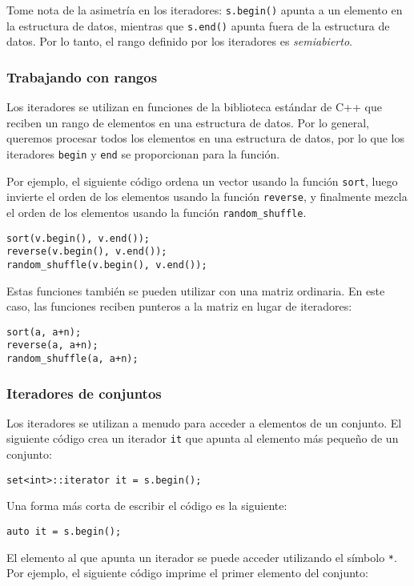 Tome nota de la asimetría en los iteradores:
\texttt{s.begin()} apunta a un elemento en la estructura de datos,
mientras que \texttt{s.end()} apunta fuera de la estructura de datos.
Por lo tanto, el rango definido por los iteradores es \emph{semiabierto}.

\subsubsection{Trabajando con rangos}

Los iteradores se utilizan en funciones de la biblioteca estándar de C++
que reciben un rango de elementos en una estructura de datos.
Por lo general, queremos procesar todos los elementos en una
estructura de datos, por lo que los iteradores
\texttt{begin} y \texttt{end} se proporcionan para la función.

Por ejemplo, el siguiente código ordena un vector
usando la función \texttt{sort},
luego invierte el orden de los elementos usando la función
\texttt{reverse}, y finalmente mezcla el orden de
los elementos usando la función \texttt{random\_shuffle}.


\begin{lstlisting}
sort(v.begin(), v.end());
reverse(v.begin(), v.end());
random_shuffle(v.begin(), v.end());
\end{lstlisting}

Estas funciones también se pueden utilizar con una matriz ordinaria.
En este caso, las funciones reciben punteros a la matriz
en lugar de iteradores:

\newpage
\begin{lstlisting}
sort(a, a+n);
reverse(a, a+n);
random_shuffle(a, a+n);
\end{lstlisting}

\subsubsection{Iteradores de conjuntos}

Los iteradores se utilizan a menudo para acceder
a elementos de un conjunto.
El siguiente código crea un iterador
\texttt{it} que apunta al elemento más pequeño de un conjunto:
\begin{lstlisting}
set<int>::iterator it = s.begin();
\end{lstlisting}
Una forma más corta de escribir el código es la siguiente:
\begin{lstlisting}
auto it = s.begin();
\end{lstlisting}
El elemento al que apunta un iterador
se puede acceder utilizando el símbolo \texttt{*}.
Por ejemplo, el siguiente código imprime
el primer elemento del conjunto:

